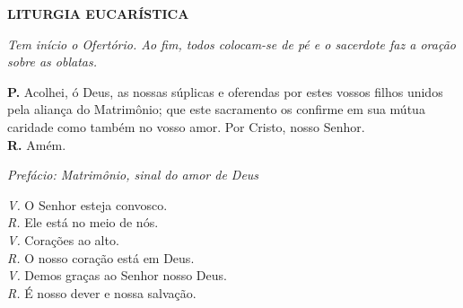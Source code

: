 \documentclass[a5paper,9pt]{memoir}
\begin{document}
{\begin{center}
\bfseries
LITURGIA EUCAR\'ISTICA
\end{center}

{\itshape \color{mygray}Tem início o Ofertório. Ao fim, todos colocam-se de p\'e e o sacerdote faz a oração sobre as oblatas.}

%	
%
%
%
%
%
%

\textbf{P.} Acolhei, \'o Deus, as nossas s\'uplicas e oferendas por estes vossos filhos unidos pela alian\c ca do Matrim\^onio; que este sacramento os confirme em sua m\'utua caridade como tamb\'em no vosso amor. Por Cristo, nosso Senhor.\\
{\textbf{R.} Am\'em.}

\hfill {\itshape \color{mygray} Prefácio: Matrim\^onio, sinal do amor de Deus}

{\itshape \color{mygray}V.} O Senhor esteja convosco.\\
{\itshape \color{mygray}R.} Ele está no meio de nós.\\
{\itshape \color{mygray}V.} Corações ao alto.\\
{\itshape \color{mygray}R.} O nosso coração está em Deus.\\
{\itshape \color{mygray}V.} Demos graças ao Senhor nosso Deus.\\
{\itshape \color{mygray}R.} É nosso dever e nossa salvação.

}
\end{document}
